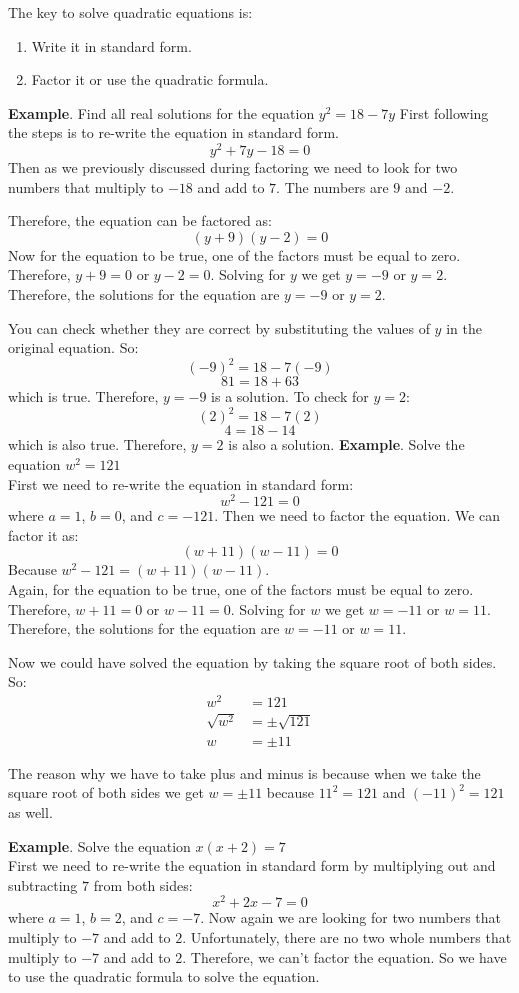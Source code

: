 The key to solve quadratic equations is: 
\begin{enumerate}
    \item Write it in standard form.
    \item Factor it or use the quadratic formula.
\end{enumerate}

\textbf{Example}. Find all real solutions for the equation $y^2=18-7y$
First following the steps is to re-write the equation in standard form.
$$y^2+7y-18=0$$
Then as we previously discussed during factoring we need to look for two numbers that multiply to $-18$ and add to $7$. The numbers are $9$ and $-2$.

Therefore, the equation can be factored as:
$$(y+9)(y-2)=0$$
Now for the equation to be true, one of the factors must be equal to zero. Therefore, $y+9=0$ or $y-2=0$. Solving for $y$ we get $y=-9$ or $y=2$. Therefore, the solutions for the equation are $y=-9$ or $y=2$.

You can check whether they are correct by substituting the values of $y$ in the original equation. So:
$$(-9)^2=18-7(-9)$$
$$81=18+63$$ which is true. Therefore, $y=-9$ is a solution.
To check for $y=2$:
$$(2)^2=18-7(2)$$
$$4=18-14$$ which is also true. Therefore, $y=2$ is also a solution.
\newpage
\textbf{Example}. Solve the equation $w^2=121$ \\
First we need to re-write the equation in standard form:
$$w^2-121=0$$ where $a=1$, $b=0$, and $c=-121$.
Then we need to factor the equation. We can factor it as:
$$(w+11)(w-11)=0$$ Because $w^2-121=(w+11)(w-11)$. \\

Again, for the equation to be true, one of the factors must be equal to zero. Therefore, $w+11=0$ or $w-11=0$. Solving for $w$ we get $w=-11$ or $w=11$. Therefore, the solutions for the equation are $w=-11$ or $w=11$.

Now we could have solved the equation by taking the square root of both sides. So:
\begin{align*}
    w^2&=121 \\
    \sqrt{w^2}&=\pm \sqrt{121} \\
    w&=\pm 11
\end{align*}

The reason why we have to take plus and minus is because when we take the square root of both sides we get $w=\pm 11$ because $11^2=121$ and $(-11)^2=121$ as well.

\textbf{Example}. Solve the equation $x(x+2) = 7$
\\
First we need to re-write the equation in standard form by multiplying out and subtracting $7$ from both sides:
$$x^2+2x-7=0$$ where $a=1$, $b=2$, and $c=-7$.
Now again we are looking for two numbers that multiply to $-7$ and add to $2$. Unfortunately, there are no two whole numbers that multiply to $-7$ and add to $2$. Therefore, we can't factor the equation. So we have to use the quadratic formula to solve the equation.
